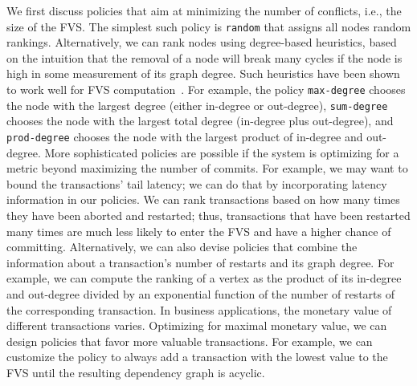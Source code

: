 We first discuss policies that aim at minimizing the number of conflicts, i.e., the size of the FVS. The simplest such policy is \texttt{random} that assigns all nodes random rankings. Alternatively, we can rank nodes using degree-based heuristics, based on the intuition that the removal of a node will break many cycles if the node is high in some measurement of its graph degree. Such heuristics have  been shown to work well for FVS computation~\cite{cutello2015targeting}. For example, the policy \texttt{max-degree} chooses the node with the largest degree (either in-degree or out-degree), \texttt{sum-degree} chooses the node with the largest total degree (in-degree plus out-degree), and \texttt{prod-degree} chooses the node with the largest product of in-degree and out-degree. 
More sophisticated policies are possible if the system is optimizing for a metric beyond maximizing the number of commits. For example, we may want to bound the transactions' tail latency; we can do that by incorporating latency information in our policies. We can rank transactions based on how many times they have been aborted and restarted; thus, transactions that have been restarted many times are much less likely to enter the FVS and have a higher chance of committing. Alternatively, we can also devise policies that combine the information about a transaction's number of restarts and its graph degree. For example, we can compute the ranking of a vertex as the product of its in-degree and out-degree divided by an exponential function of the number of restarts of the corresponding transaction. 
In business applications, the monetary value of different transactions varies. Optimizing for maximal monetary value, we can design policies that favor more valuable transactions. For example, we can customize the policy to always add a transaction with the lowest value to the FVS until the resulting dependency graph is acyclic.

